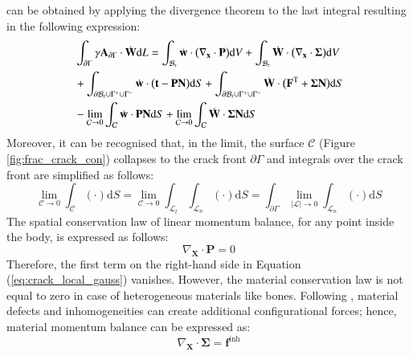 \documentclass[11pt]{acmeArticle}
\numberwithin{equation}{section}
\begin{document}
can be obtained by applying the divergence theorem to the last integral resulting in the following expression:
\begin{equation}\label{eq:crack_local_gauss}
\begin{aligned}
&  \int_{\partial \Gamma } \gamma \mathbf A_{\partial \Gamma} \cdot {\dot {\boldsymbol {\rm W} } } \mathrm d L = \int_{\mathcal B_t} {\dot {\boldsymbol {\rm w} } } \cdot \big( \nabla_{\mathbf x} \cdot \mathbf P  \big) \mathrm d V + \int_{\mathcal B_t} {\dot {\boldsymbol {\rm W} } } \cdot \big( \nabla_{\mathbf x} \cdot \mathbf \Sigma \big) \mathrm d V \\
& +\int_{\partial \mathcal B_t \cup \Gamma^+ \cup \Gamma^-} {\dot {\boldsymbol {\rm w} } }\cdot \big( \mathbf t - \mathbf{PN}\big) \mathrm  d S + \int_{\partial \mathcal B_t \cup \Gamma^+ \cup \Gamma^-}  {\dot {\boldsymbol {\rm W} } } \cdot \big( \mathbf F^{\rm T} + \mathbf{\Sigma N} \big) \mathrm d S \\
& - \lim_{\mathcal C \to 0} \int_{\mathcal C} {\dot {\boldsymbol {\rm w} } } \cdot \mathbf {PN} \mathrm d S + \lim_{\mathcal C \to 0} \int_{\mathcal C} {\dot {\boldsymbol {\rm W} } } \cdot \mathbf{\Sigma N} \mathrm d S
\end{aligned}
\end{equation}
Moreover, it can be recognised that, in the limit, the surface $\mathcal C$ (Figure \ref{fig:frac_crack_con}) collapses to the crack front $\partial \Gamma $ and integrals over the crack front are simplified as follows:
\begin{equation}
\lim_{\mathcal C \to 0} \int_{\mathcal C} (\cdot ) \mathrm d S = \lim_{\mathcal C \to 0} \int_{\mathcal L_t} \int_{\mathcal L_n} (\cdot) \mathrm d S = \int_{\partial \Gamma} \lim_{|\mathcal{ L }|\to 0} \int_{\mathcal L_n } (\cdot ) \mathrm d S
\end{equation}
The spatial conservation law of linear momentum balance, for any point inside the body, is expressed as follows:
\begin{equation}
\nabla_{\mathbf X} \cdot \mathbf P = 0
\end{equation}
Therefore, the first term on the right-hand side in Equation (\ref{eq:crack_local_gauss}) vanishes. 
However, the material conservation law is not equal to zero in case of heterogeneous materials like bones. Following \citep{kienzler2014configurational}, material defects and inhomogeneities can create additional configurational forces; hence, material momentum balance can be expressed as:
\begin{equation}
\nabla_{\mathbf X } \cdot \mathbf \Sigma = \mathbf f^{\mathrm {inh}}
\end{equation}
\end{document}
